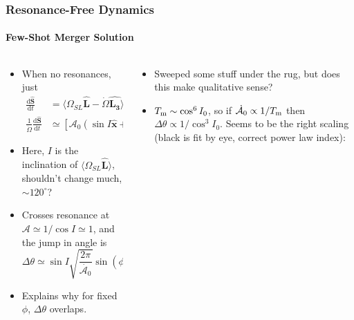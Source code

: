 \documentclass[dvipsnames, 8pt]{beamer}
\newcommand*{\rd}[2]{\frac{\mathrm{d}#1}{\mathrm{d}#2}}
\newcommand*{\bm}[1]{\boldsymbol{\mathbf{#1}}}
\newcommand*{\uv}[1]{\hat{\bm{#1}}}
\newcommand*{\ev}[1]{\langle#1\rangle}
\newcommand*{\p}[1]{\left(#1\right)}
\newcommand*{\s}[1]{\left[#1\right]}
\begin{document}
\begin{frame}
    \frametitle{Resonance-Free Dynamics}
    \framesubtitle{Few-Shot Merger Solution}

    \begin{columns}
        \begin{column}{0.5\textwidth}
            \begin{itemize}
                \item When no resonances, just
                    \begin{align}
                        \rd{\uv{S}}{t} &=
                            \ev{\Omega_{SL}\uv{L} - \dot{\Omega} \uv{L_3}}_{LK}
                                \times \uv{S},\\
                        \frac{1}{\dot{\Omega}} \rd{\uv{S}}{t}
                            &\simeq \s{\mathcal{A}_0\p{\sin I \uv{x}
                                + \cos I \uv{z}}
                                \mp \uv{z}} \times \uv{S}.
                    \end{align}

                \item Here, $I$ is the inclination of $\ev{\Omega_{SL}\uv{L}}$,
                    shouldn't change much, $\sim 120^\circ$?

                \item Crosses resonance at $\mathcal{A} \simeq 1 / \cos I \simeq
                    1$, and the jump
                    in angle is
                    \begin{equation}
                        \Delta \theta \simeq \sin I
                            \sqrt{\frac{2\pi}{\dot{\mathcal{A}_0}}}
                                \sin \p{\phi_0 + \pi/4}.
                    \end{equation}

                \item Explains why for fixed $\phi$, $\Delta \theta$ overlaps.
            \end{itemize}
        \end{column}
        \begin{column}{0.5\textwidth}
            \begin{itemize}
                \item Sweeped some stuff under the rug, but does this make
                    qualitative sense?

                \item $T_{\rm m} \sim \cos^6 I_0$, so if $\dot{\mathcal{A}}_0
                    \propto 1 / T_{\rm m}$ then $\Delta \theta \propto 1 /
                    \cos^3 I_0$. Seems to be the right scaling (black is fit by
                    eye, correct power law index):


\end{itemize}
\end{column}
\end{columns}
\end{frame}
\end{document}
